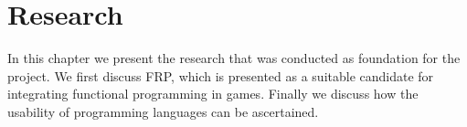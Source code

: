 \chapter{Research}
In this chapter we present the research that was conducted as foundation for the project. We first discuss \gls{FRP}, which is presented as a suitable candidate for integrating functional programming in games\cite{maraffi:frp,courtney2003yampa,cheong2005functional}. Finally we discuss how the usability of programming languages can be ascertained.




